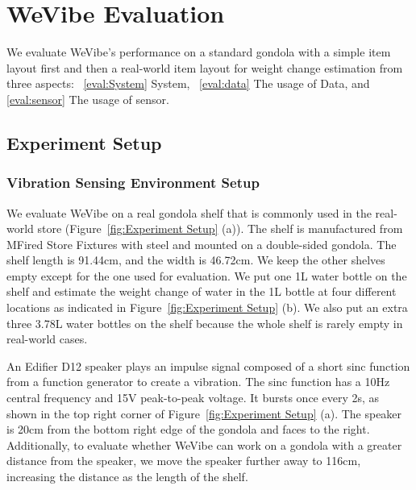 \section{WeVibe Evaluation}
\label{sec:System Evaluation}
We evaluate WeVibe's performance on a standard gondola with a simple item layout first and then a real-world item layout for weight change estimation from three aspects: ~\ref{eval:System} System, ~\ref{eval:data} The usage of Data, and \ref{eval:sensor} The usage of sensor.

\subsection{Experiment Setup}
\subsubsection{Vibration Sensing Environment Setup}
We evaluate WeVibe on a real gondola shelf that is commonly used in the real-world store (Figure~\ref{fig:Experiment Setup} (a)). The shelf is manufactured from MFired Store Fixtures\cite{mfried} with steel and mounted on a double-sided gondola. The shelf length is 91.44cm, and the width is 46.72cm. We keep the other shelves empty except for the one used for evaluation. We put one 1L water bottle on the shelf and estimate the weight change of water in the 1L bottle at four different locations as indicated in Figure~\ref{fig:Experiment Setup} (b). We also put an extra three 3.78L water bottles on the shelf because the whole shelf is rarely empty in real-world cases.

An Edifier D12 speaker plays an impulse signal composed of a short sinc function from a function generator to create a vibration. The sinc function has a 10Hz central frequency and 15V peak-to-peak voltage. It bursts once every 2s, as shown in the top right corner of Figure~\ref{fig:Experiment Setup} (a). The speaker is 20cm from the bottom right edge of the gondola and faces to the right. Additionally, to evaluate whether WeVibe can work on a gondola with a greater distance from the speaker, we move the speaker further away to 116cm, increasing the distance as the length of the shelf. 

